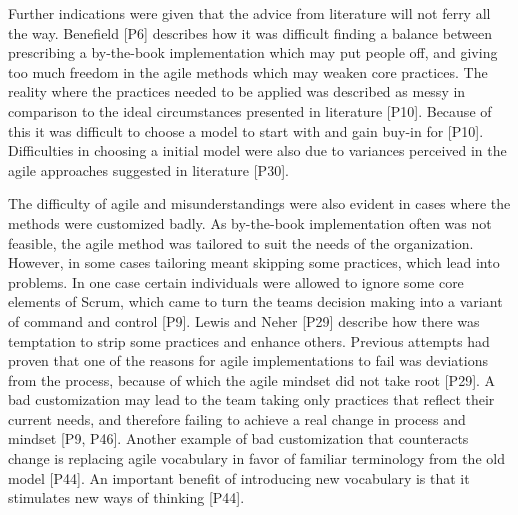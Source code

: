 \documentclass[preprint,authoryear,12pt]{elsarticle}
\begin{document}

Further indications were given that the advice from literature will not ferry
all the way. Benefield [P6] describes how it was difficult finding a balance
between prescribing a by-the-book implementation which may put people off, and
giving too much freedom in the agile methods which may weaken core practices.
The reality where the practices needed to be applied was described as messy in
comparison to the ideal circumstances presented in literature [P10]. Because of
this it was difficult to choose a model to start with and gain buy-in for [P10].
Difficulties in choosing a initial model were also due to variances perceived in
the agile approaches suggested in literature [P30].



The difficulty of agile and misunderstandings were also evident in cases where
the methods were customized badly. As by-the-book implementation often was not
feasible, the agile method was tailored to suit the needs of the organization.
However, in some cases tailoring meant skipping some practices, which lead into
problems. In one case certain individuals were allowed to ignore some core
elements of Scrum, which came to turn the teams decision making into a variant
of command and control [P9].
Lewis and Neher [P29] describe how there was temptation to strip some practices
and enhance others. Previous attempts had proven that one of the reasons for
agile implementations to fail was deviations from the process, because of which
the agile mindset did not take root [P29]. A bad customization may lead to the
team taking only practices that reflect their current needs, and therefore
failing to achieve a real change in process and mindset [P9, P46].
Another example of bad customization that counteracts change is replacing agile
vocabulary in favor of familiar terminology from the old model [P44]. An
important benefit of introducing new vocabulary is that it stimulates new ways
of thinking [P44].
\end{document}
